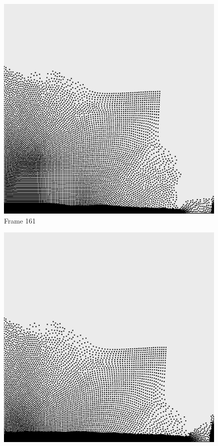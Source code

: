 \documentclass[a4paper, 12pt, oneside]{book}
\begin{document}
\begin{figure}[!ht]
    \addvspace{0.5ex}
        \begin{center}
            \includegraphics[width=\linewidth]{images/test_case_2/161.png}
            Frame 161
        \end{center}
    \endminipage
    \hfill
        \begin{center}
            \includegraphics[width=\linewidth]{images/test_case_2/181.png}

\end{center}
\end{figure}
\end{document}
